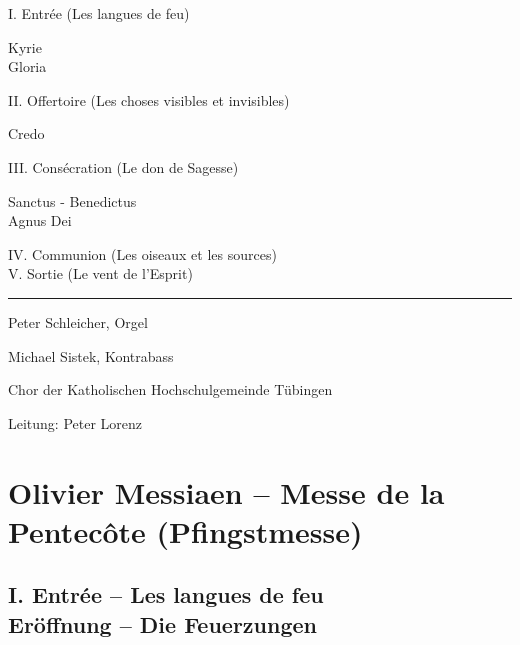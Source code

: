 \documentclass[a5paper,twoside,fontsize=11pt]{scrartcl}
\title{}
\author{}
\newcommand{\frenchandgermantitle}[2]{\subsection*{#1 \\#2}}
\begin{document}
	    

\begin{samepage}

I. Entrée (Les langues de feu)

Kyrie \\
Gloria

II. Offertoire (Les choses visibles et invisibles)

Credo

III. Consécration (Le don de Sagesse)

Sanctus - Benedictus\\
Agnus Dei

IV. Communion (Les oiseaux et les sources) \\
V. Sortie (Le vent de l’Esprit)

\vfill

\par\noindent\rule{\textwidth}{0.4pt}

\begin{flushright}
Peter Schleicher, Orgel

Michael Sistek, Kontrabass

Chor der Katholischen Hochschulgemeinde Tübingen

Leitung: Peter Lorenz

\end{flushright}

\end{samepage}

\pagebreak

\section*{Olivier Messiaen – Messe de la Pentecôte (Pfingstmesse)}
\frenchandgermantitle{I. Entrée – Les langues de feu}{Eröffnung – Die Feuerzungen}
\end{document}
